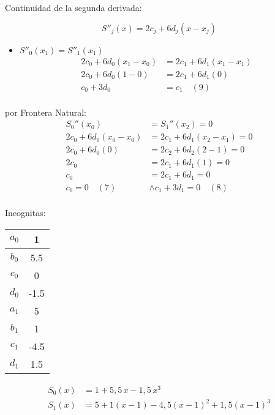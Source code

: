 \documentclass[12pt]{article}
\begin{document}
\begin{enumerate}
        Continuidad de la segunda derivada:

        \[S''_j(x) = 2c_j + 6d_j(x -x_j)\]
        
        \begin{itemize}
            \item $S''_0(x_1) = S''_1(x_1)$
            \[
            \begin{aligned}
            2c_0 + 6d_0(x_1 -x_0) &= 2c_1 + 6d_1(x_1 -x_1) \\     
            2c_0 + 6d_0(1-0) &= 2c_1 + 6d_1(0) \\     
            c_0 + 3d_0 &= c_1 \quad (9) \\     
            \end{aligned}
            \]
        \end{itemize}

        por Frontera Natural:
        \[
        \begin{aligned}
        S_0''(x_0) &= S_1''(x_2) = 0 \\
        2c_0 + 6d_0(x_0 - x_0) &= 2c_1 + 6d_1(x_2 - x_1) = 0 \\
        2c_0 + 6d_0(0) &= 2c_2 + 6d_2(2 - 1) = 0 \\
        2c_0 &= 2c_1 + 6d_1(1) = 0 \\
        c_0 &= 2c_1 + 6d_1 = 0 \\
        c_0 = 0 \quad (7) &\land c_1 + 3d_1 = 0 \quad (8)\\
        \end{aligned}
        \]


        Incognitas:
        \begin{table}
        \centering
        \begin{tabular}{|c|c|}
        \hline
        $a_0$& 1    \\\hline 
        $b_0$& 5.5     \\\hline
        $c_0$& 0        \\ \hline
        $d_0$& -1.5     \\ \hline
        $a_1$& 5        \\ \hline
        $b_1$& 1   \\ \hline     
        $c_1$& -4.5 \\ \hline
        $d_1$& 1.5 \\ \hline
        \end{tabular}
        \end{table}

        \[
        \begin{aligned}
        S_0(x) &= 1 + 5{,}5\,x - 1{,}5\,x^3 \\
        S_1(x) &= 5 + 1(x - 1) - 4{,}5(x - 1)^2 + 1{,}5(x - 1)^3
        \end{aligned}
        \]  


\end{enumerate}
\end{document}

